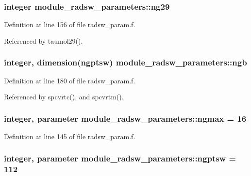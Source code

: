 \subsubsection[{\texorpdfstring{ng29}{ng29}}]{\setlength{\rightskip}{0pt plus 5cm}integer module\+\_\+radsw\+\_\+parameters\+::ng29}\hypertarget{group__module__radsw__main_gaa53b1af0366b40653a6f0868858b9f3d}{}\label{group__module__radsw__main_gaa53b1af0366b40653a6f0868858b9f3d}


Definition at line 156 of file radsw\+\_\+param.\+f.



Referenced by taumol29().

\subsubsection[{\texorpdfstring{ngb}{ngb}}]{\setlength{\rightskip}{0pt plus 5cm}integer, dimension(ngptsw) module\+\_\+radsw\+\_\+parameters\+::ngb}\hypertarget{group__module__radsw__main_gafdd8496d7eaa017f7f1e08e998945c1e}{}\label{group__module__radsw__main_gafdd8496d7eaa017f7f1e08e998945c1e}


Definition at line 180 of file radsw\+\_\+param.\+f.



Referenced by spcvrtc(), and spcvrtm().

\subsubsection[{\texorpdfstring{ngmax}{ngmax}}]{\setlength{\rightskip}{0pt plus 5cm}integer, parameter module\+\_\+radsw\+\_\+parameters\+::ngmax = 16}\hypertarget{group__module__radsw__main_ga0ba0ff5c18d3303a852d88687b4b5ca9}{}\label{group__module__radsw__main_ga0ba0ff5c18d3303a852d88687b4b5ca9}


Definition at line 145 of file radsw\+\_\+param.\+f.

\subsubsection[{\texorpdfstring{ngptsw}{ngptsw}}]{\setlength{\rightskip}{0pt plus 5cm}integer, parameter module\+\_\+radsw\+\_\+parameters\+::ngptsw = 112}\hypertarget{group__module__radsw__main_gadc3e4d5a848d50e2883e05c62f61bc97}{}\label{group__module__radsw__main_gadc3e4d5a848d50e2883e05c62f61bc97}


